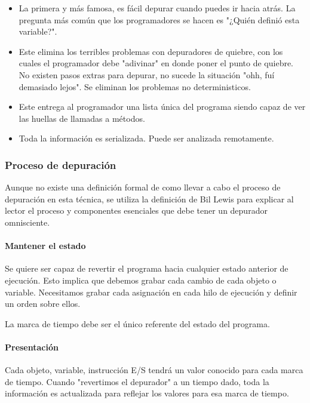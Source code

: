 \documentclass[12pt,a4paper]{report}
\begin{document}
\begin{itemize}
	\item La primera y más famosa, es fácil depurar cuando puedes ir hacia atrás.  La pregunta más común que los programadores se hacen es "¿Quién definió esta variable?".

	\item Este elimina los terribles problemas con depuradores de quiebre, con los cuales el programador debe "adivinar" en donde poner el punto de quiebre.  No existen pasos extras para depurar, no sucede la situación "ohh, fuí demasiado lejos".  Se eliminan los problemas no deterministicos.

	\item Este entrega al programador una lista única del programa siendo capaz de ver las huellas de llamadas a métodos.

	\item Toda la información es serializada.  Puede ser analizada remotamente.
\end{itemize}

			\subsubsection{Proceso de depuración}

Aunque no existe una definición formal de como llevar a cabo el proceso de depuración en esta técnica, se utiliza la definición de Bil Lewis para explicar al lector el proceso y componentes esenciales que debe tener un depurador omnisciente.

				\paragraph{Mantener el estado}

Se quiere ser capaz de revertir el programa hacia cualquier estado anterior de ejecución.  Esto implica que debemos grabar cada cambio de cada objeto o variable.  Necesitamos grabar cada asignación en cada hilo de ejecución y definir un orden sobre ellos.

La marca de tiempo debe ser el único referente del estado del programa.

				\paragraph{Presentación}

Cada objeto, variable, instrucción E/S tendrá un valor conocido para cada marca de tiempo.  Cuando "revertimos el depurador" a un tiempo dado, toda la información es actualizada para reflejar los valores para esa marca de tiempo.
\end{document}
